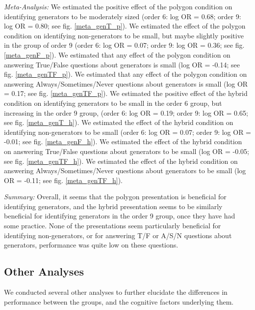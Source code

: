 \documentclass[man,10pt]{apa6}
\begin{document}
\textit{Meta-Analysis:}  We estimated the positive effect of the polygon condition on identifying generators to be moderately sized (order 6: log OR = 0.68; order 9: log OR = 0.80; see fig. \ref{meta_genT_p}). We estimated the effect of the polygon condition on identifying non-generators to be small, but maybe slightly positive in the group of order 9 (order 6: log OR = 0.07; order 9: log OR = 0.36; see fig. \ref{meta_genF_p}). We estimated that any effect of the polygon condition on answering True/False questions about generators is small (log OR = -0.14; see fig. \ref{meta_genTF_p}). We estimated that any effect of the polygon condition on answering Always/Sometimes/Never questions about generators is small (log OR = 0.17; see fig. \ref{meta_genTF_p}). We estimated the positive effect of the hybrid condition on identifying generators to be small in the order 6 group, but increasing in the order 9 group, (order 6: log OR = 0.19; order 9: log OR = 0.65; see fig. \ref{meta_genT_h}). We estimated the effect of the hybrid condition on identifying non-generators to be small (order 6: log OR = 0.07; order 9: log OR = -0.01; see fig. \ref{meta_genF_h}). We estimated the effect of the hybrid condition on answering True/False questions about generators to be small (log OR = -0.05; see fig. \ref{meta_genTF_h}). We estimated the effect of the hybrid condition on answering Always/Sometimes/Never questions about generators to be small (log OR = -0.11; see fig. \ref{meta_genTF_h}).\par
\textit{Summary:} Overall, it seems that the polygon presentation is beneficial for identifying generators, and the hybrid presentation seems to be similarly beneficial for identifying generators in the order 9 group, once they have had some practice. None of the presentations seem particularly beneficial for identifying non-generators, or for answering T/F or A/S/N questions about generators, performance was quite low on these questions.
\FloatBarrier
\subsection{Other Analyses}
We conducted several other analyses to further elucidate the differences in performance between the groups, and the cognitive factors underlying them.\\
\end{document}
